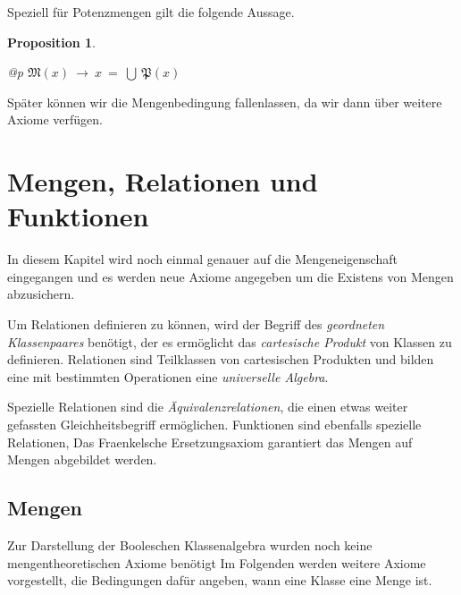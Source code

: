 \documentclass[a4paper,german,10pt,twoside]{book}
\newtheorem{prop}[thm]{Proposition}
\theoremstyle{definition}
\theoremstyle{remark}
\begin{document}
\par
Speziell f{\"u}r Potenzmengen gilt die folgende Aussage.

\begin{prop}
\label{theorem:powerSetPropositions} \hypertarget{theorem:powerSetPropositions}{}
\mbox{}
\begin{longtable}{{@{\extracolsep{\fill}}p{\linewidth}}}
\centering $\mathfrak{M}(x)\ \rightarrow \ x \ =  \ \bigcup \ \mathfrak{P}(x)$
\end{longtable}

\end{prop}

Sp{\"a}ter k{\"o}nnen wir die Mengenbedingung fallenlassen, da wir dann {\"u}ber weitere Axiome
verf{\"u}gen.




\chapter{Mengen, Relationen und Funktionen} \label{chapter4} \hypertarget{chapter4}{}

In diesem Kapitel wird noch einmal genauer auf die Mengeneigenschaft eingegangen und es werden neue Axiome angegeben um die Existens von Mengen abzusichern.

\par
Um Relationen definieren zu k{\"o}nnen, wird der Begriff des \emph{geordneten Klassenpaares} ben{\"o}tigt,
der es erm{\"o}glicht das \emph{cartesische Produkt} von Klassen zu definieren. Relationen sind
Teilklassen von cartesischen Produkten und bilden eine mit bestimmten Operationen eine
\emph{universelle Algebra}. 

\par
Spezielle Relationen sind die \emph{{\"A}quivalenzrelationen}, die einen etwas
weiter gefassten Gleichheitsbegriff erm{\"o}glichen. Funktionen sind ebenfalls spezielle Relationen,
Das Fraenkelsche Ersetzungsaxiom garantiert das Mengen auf Mengen abgebildet werden.

\section{Mengen} \label{chapter4_section0} \hypertarget{chapter4_section0}{}
Zur Darstellung der Booleschen Klassenalgebra wurden noch keine mengentheoretischen Axiome ben{\"o}tigt
Im Folgenden werden weitere Axiome vorgestellt, die Bedingungen daf{\"u}r angeben, wann eine Klasse
eine Menge ist.
\end{document}
